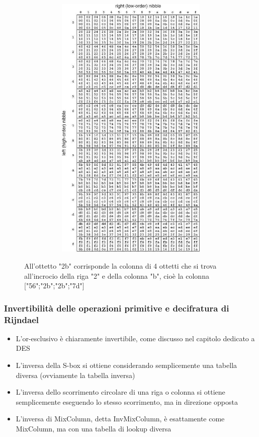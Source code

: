 \begin{figure}[htbp]
	\centering%
	\subfigure%
	{\includegraphics[height=13cm, width=13cm, keepaspectratio]{Immagini/Capitolo2/rijndael_mixcol_lookup.png}}
	\caption{All'ottetto "2b" corrisponde la colonna di 4 ottetti che si trova all’incrocio della riga "2" e della colonna "b", cioè la colonna ["56";"2b";"2b";"7d"] \label{fig:Rij_mixcol_lookup}} 	
\end{figure}

\subsubsection{Invertibilità delle operazioni primitive e decifratura di Rijndael}
\begin{itemize}
  \item L'or-esclusivo è chiaramente invertibile, come discusso nel capitolo dedicato a DES
  \item L'inversa della S-box si ottiene considerando semplicemente una tabella diversa (ovviamente la tabella inversa)
  \item L'inversa dello scorrimento circolare di una riga o colonna si ottiene semplicemente eseguendo lo stesso scorrimento, ma in direzione opposta
  \item L'inversa di MixColumn, detta InvMixColumn, è esattamente come MixColumn, ma con una tabella di lookup diversa
\end{itemize}

